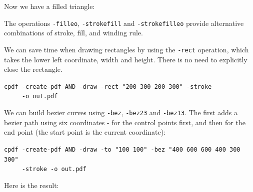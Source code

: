 \documentclass{book}
\begin{document}
\noindent Now we have a filled triangle:

\bigskip
{}
\bigskip

\noindent The operations \texttt{-filleo}, \texttt{-strokefill} and \texttt{-strokefilleo} provide alternative combinations of stroke, fill, and winding rule.

We can save time when drawing rectangles by using the \texttt{-rect} operation, which takes the lower left coordinate, width and height. There is no need to explicitly close the rectangle.

\begin{framed}
 \noindent\small\verb?cpdf -create-pdf AND -draw -rect "200 300 200 300" -stroke?\\
 \noindent\small\verb?     -o out.pdf?
\end{framed}

\noindent We can build bezier curves using \texttt{-bez}, \texttt{-bez23} and \texttt{-bez13}. The first adds a bezier path using six coordinates - for the control points first, and then for the end point (the start point is the current coordinate):

\begin{framed}
 \noindent\small\verb?cpdf -create-pdf AND -draw -to "100 100" -bez "400 600 600 400 300 300"?\\
 \noindent\small\verb?     -stroke -o out.pdf?
\end{framed}

\noindent Here is the result:

\bigskip
{}
\bigskip
\end{document}
